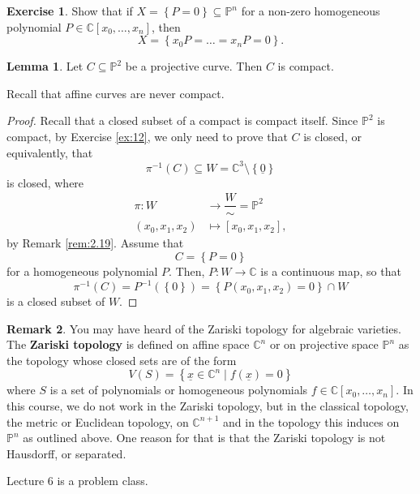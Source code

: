 \documentclass{article}
\newcommand{\C}{\mathbb{C}}
\renewcommand{\P}{\mathbb{P}}
\newcommand{\rb}[1]{\left( #1 \right)}
\renewcommand{\sb}[1]{\left[ #1 \right]}
\newcommand{\cb}[1]{\left\{ #1 \right\}}
\theoremstyle{definition}\newtheorem{definition}{Definition}[section]
\theoremstyle{definition}\newtheorem{notation}[definition]{Notation}
\theoremstyle{definition}\newtheorem{remark}[definition]{Remark}
\theoremstyle{definition}\newtheorem{example1}[definition]{Example}
\theoremstyle{definition}\newtheorem{fact}{Fact}
\theoremstyle{definition}\newtheorem{exercise}{Exercise}
\theoremstyle{definition}\newtheorem*{example2}{Example}
\newtheorem{lemma}[definition]{Lemma}
\begin{document}
\begin{exercise}
Show that if $ X = \cb{P = 0} \subseteq \P^n $ for a non-zero homogeneous polynomial $ P \in \C\sb{x_0, \dots, x_n} $, then
$$ X = \cb{x_0P = \dots = x_nP = 0}. $$
\end{exercise}

\begin{lemma}
Let $ C \subseteq \P^2 $ be a projective curve. Then $ C $ is compact.
\end{lemma}

Recall that affine curves are never compact.

\begin{proof}
Recall that a closed subset of a compact is compact itself. Since $ \P^2 $ is compact, by Exercise \ref{ex:12}, we only need to prove that $ C $ is closed, or equivalently, that
$$ \pi^{-1}\rb{C} \subseteq W = \C^3 \setminus \cb{\underline{0}} $$
is closed, where
\begin{align*}
\pi : W & \to \dfrac{W}{\sim} = \P^2 \\
\rb{x_0, x_1, x_2} & \mapsto \sb{x_0, x_1, x_2},
\end{align*}
by Remark \ref{rem:2.19}. Assume that
$$ C = \cb{P = 0} $$
for a homogeneous polynomial $ P $. Then, $ P : W \to \C $ is a continuous map, so that
$$ \pi^{-1}\rb{C} = P^{-1}\rb{\cb{0}} = \cb{P\rb{x_0, x_1, x_2} = 0} \cap W $$
is a closed subset of $ W $.
\end{proof}

\begin{remark}
You may have heard of the Zariski topology for algebraic varieties. The \textbf{Zariski topology} is defined on affine space $ \C^n $ or on projective space $ \P^n $ as the topology whose closed sets are of the form
$$ V\rb{S} = \cb{\underline{x} \in \C^n \mid f\rb{\underline{x}} = 0} $$
where $ S $ is a set of polynomials or homogeneous polynomials $ f \in \C\sb{x_0, \dots, x_n} $. In this course, we do not work in the Zariski topology, but in the classical topology, the metric or Euclidean topology, on $ \C^{n + 1} $ and in the topology this induces on $ \P^n $ as outlined above. One reason for that is that the Zariski topology is not Hausdorff, or separated.
\end{remark}


Lecture 6 is a problem class.

\pagebreak
\end{document}

